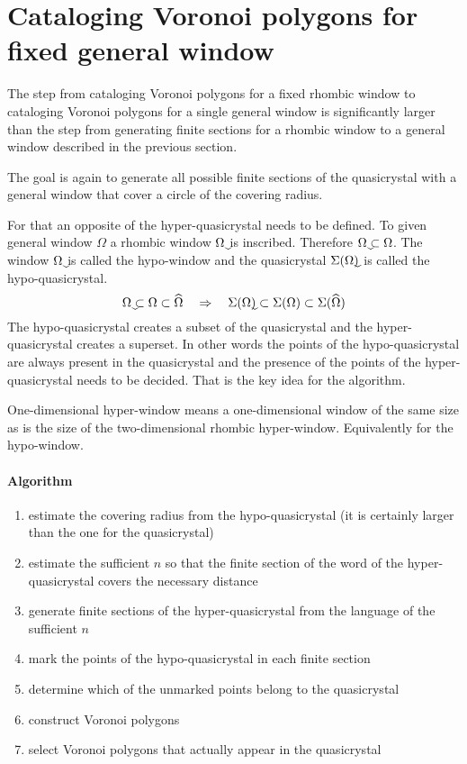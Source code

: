\documentclass[text.tex]{subfiles}
\begin{document}
\section{Cataloging Voronoi polygons for fixed general window}
The step from cataloging Voronoi polygons for a fixed rhombic window to cataloging Voronoi polygons for a single general window is significantly larger than the step from generating finite sections for a rhombic window to a general window described in the previous section. 

The goal is again to generate all possible finite sections of the quasicrystal with a general window that cover a circle of the covering radius. 

For that an opposite of the hyper-quasicrystal needs to be defined. To given general window $\Omega$ a rhombic window $\uwidehat{\Omega}$ is inscribed. Therefore $\uwidehat{\Omega}\subset\Omega$. The window $\uwidehat{\Omega}$ is called the hypo-window and the quasicrystal $\quasi{\uwidehat{\Omega}}$ is called the hypo-quasicrystal. 
$$\uwidehat{\Omega}\subset\Omega\subset\widehat{\Omega} \quad \Rightarrow \quad \quasi{\uwidehat{\Omega}}\subset\quasi{\Omega}\subset\quasi{\widehat{\Omega}}$$
The hypo-quasicrystal creates a subset of the quasicrystal and the hyper-quasicrystal creates a superset. In other words the points of the hypo-quasicrystal are always present in the quasicrystal and the presence of the points of the hyper-quasicrystal needs to be decided. That is the key idea for the algorithm. 

\begin{remark}
One-dimensional hyper-window means a one-dimensional window of the same size as is the size of the two-dimensional rhombic hyper-window. Equivalently for the hypo-window. 
\end{remark}

\paragraph{Algorithm}
\begin{enumerate}
\item estimate the covering radius from the hypo-quasicrystal (it is certainly larger than the one for the quasicrystal)
\item estimate the sufficient $n$ so that the finite section of the word of the hyper-quasicrystal covers the necessary distance
\item generate finite sections of the hyper-quasicrystal from the language of the sufficient $n$
\item mark the points of the hypo-quasicrystal in each finite section
\item determine which of the unmarked points belong to the quasicrystal
\item construct Voronoi polygons
\item select Voronoi polygons that actually appear in the quasicrystal
\end{enumerate}
\end{document}
